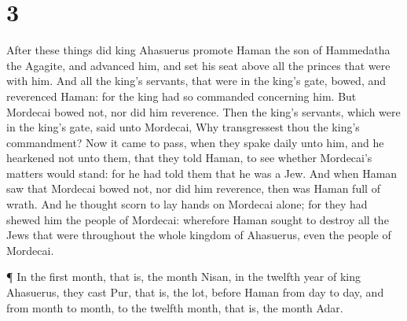 \hypertarget{section-2}{%
\section{3}\label{section-2}}

 After these things did king Ahasuerus promote Haman the son
of Hammedatha the Agagite, and advanced him, and set his seat above all
the princes that were with him.  And all the king's
servants, that were in the king's gate, bowed, and reverenced Haman: for
the king had so commanded concerning him. But Mordecai bowed not, nor
did him reverence.  Then the king's servants, which were in
the king's gate, said unto Mordecai, Why transgressest thou the king's
commandment?  Now it came to pass, when they spake daily
unto him, and he hearkened not unto them, that they told Haman, to see
whether Mordecai's matters would stand: for he had told them that he was
a Jew.  And when Haman saw that Mordecai bowed not, nor did
him reverence, then was Haman full of wrath.  And he thought
scorn to lay hands on Mordecai alone; for they had shewed him the people
of Mordecai: wherefore Haman sought to destroy all the Jews that were
throughout the whole kingdom of Ahasuerus, even the people of Mordecai.

 ¶ In the first month, that is, the month Nisan, in the
twelfth year of king Ahasuerus, they cast Pur, that is, the lot, before
Haman from day to day, and from month to month, to the twelfth month,
that is, the month Adar.

